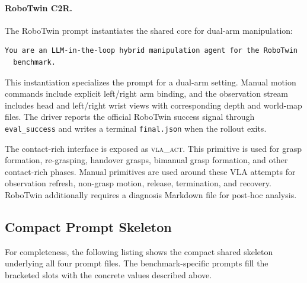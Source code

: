 \documentclass{article}
\begin{document}
  \paragraph{RoboTwin C2R.}
  The RoboTwin prompt instantiates the shared core for dual-arm manipulation:

  \begin{lstlisting}[frame=single,framerule=0.5pt]
  You are an LLM-in-the-loop hybrid manipulation agent for the RoboTwin
  benchmark.
  \end{lstlisting}

  This instantiation specializes the prompt for a dual-arm setting. Manual motion
  commands include explicit left/right arm binding, and the observation stream includes
  head and left/right wrist views with corresponding depth and world-map files. The
  driver reports the official RoboTwin success signal through \texttt{eval\_success} and
  writes a terminal \texttt{final.json} when the rollout exits.

  The contact-rich interface is exposed as \textsc{vla\_act}. This primitive is used
  for grasp formation, re-grasping, handover grasps, bimanual grasp
  formation, and other contact-rich phases. Manual primitives are used around these VLA
  attempts for observation refresh, non-grasp motion, release, termination, and recovery.
  RoboTwin additionally requires a diagnosis Markdown file for post-hoc analysis.

\subsection{Compact Prompt Skeleton}
\label{app:agent_prompt:skeleton}

For completeness, the following listing shows the compact shared skeleton underlying
all four prompt files. The benchmark-specific prompts fill the bracketed slots with
the concrete values described above.
\end{document}
